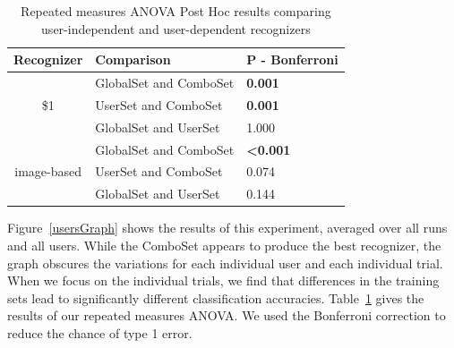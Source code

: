 \documentclass{egpubl}
\begin{document}
\begin{table}
\begin{tabular}{|c|l|l|}
\hline
Recognizer & Comparison & P - Bonferroni \\
\hline
 & GlobalSet and ComboSet & \textbf{0.001} \\
\$1 & UserSet and ComboSet & \textbf{0.001} \\
 & GlobalSet and UserSet & 1.000 \\
\hline
 & GlobalSet and ComboSet & \textbf{<0.001} \\
image-based & UserSet and ComboSet & 0.074 \\
 & GlobalSet and UserSet & 0.144 \\
 \hline
\end{tabular}
\caption{Repeated measures ANOVA Post Hoc results comparing user-independent and user-dependent recognizers}
\label{anovaTable}
\end{table}

Figure~\ref{usersGraph} shows the results of this experiment, averaged over all runs and all users.  While the ComboSet appears to produce the best recognizer, the graph obscures the variations for each individual user and each individual trial.  When we focus on the individual trials, we find that differences in the training sets lead to significantly different classification accuracies.  Table~\ref{anovaTable} gives the results of our repeated measures ANOVA.  We used the Bonferroni correction to reduce the chance of type 1 error. 
\end{document}
